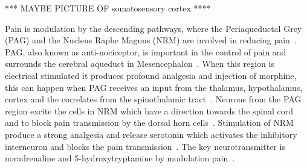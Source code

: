 *** MAYBE PICTURE OF somatosensory cortex ****

Pain is modulation by the descending pathways, where the Periaqueductal Grey (PAG) and the Nucleus Raphe Magnus (NRM) are involved in reducing pain~\cite{Steeds2013}. PAG, also known as anti-nociceptor, is important in the control of pain and surrounds the cerebral aqueduct in Mesencephalon~\cite{Steeds2013}. When this region is electrical stimulated it produces profound analgesia and injection of morphine, this can happen when PAG receives an input from the thalamus, hypothalamus, cortex and the correlates from the spinothalamic tract~\cite{Steeds2013}. Neurons from the PAG region excite the cells in NRM which have a direction towards the spinal cord and to block pain transmission by the dorsal horn cells~\cite{Steeds2013}. Stimulation of NRM produce a strong analgesia and release serotonin which activates the inhibitory interneuron and blocks the pain transmission~\cite{Steeds2013}. The key neurotransmitter is noradrenaline and 5-hydroxytryptamine by modulation pain~\cite{Steeds2013}. 


